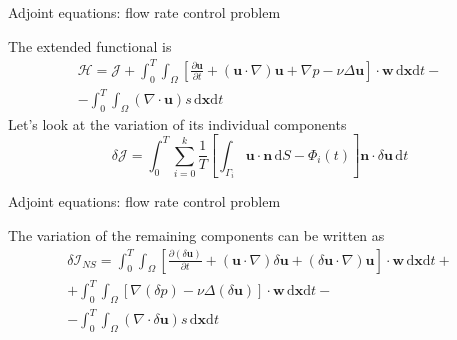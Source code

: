 \documentclass{beamer}
\begin{document}
\begin{frame}{Adjoint equations: flow rate control problem}

	The extended functional is
	\begin{multline}
		\mathcal{H}=\mathcal{J}+\int_{0}^{T}\int_{\Omega}\left[\frac{\partial\mathbf{u}}{\partial t}+\left(\mathbf{u}\cdot\nabla\right)\mathbf{u}+\nabla p-\nu\Delta\mathbf{u}\right]\cdot\mathbf{w}\,\mathrm{d}\mathbf{x}\mathrm{d}t- \\
		-\int_{0}^{T}\int_{\Omega}\left(\nabla\cdot\mathbf{u}\right)s\,\mathrm{d}\mathbf{x}\mathrm{d}t
	\end{multline}
	Let's look at the variation of its individual components
	\begin{equation}
		\delta\mathcal{J}=\int_{0}^{T}\sum_{i=0}^{k}\frac{1}{T}\left[\int_{\Gamma_{i}}\mathbf{u}\cdot\mathbf{n}\,\mathrm{d}S-\Phi_{i}\left(t\right)\right]\mathbf{n}\cdot\delta\mathbf{u}\,\mathrm{d}t
	\end{equation}

\end{frame}

\begin{frame}{Adjoint equations: flow rate control problem}

	The variation of the remaining components can be written as
	\begin{multline}
		\delta\mathcal{I}_{NS}=\int_{0}^{T}\int_{\Omega}\left[\frac{\partial\left(\delta\mathbf{u}\right)}{\partial t}+\left(\mathbf{u}\cdot\nabla\right)\delta\mathbf{u}+\left(\delta\mathbf{u}\cdot\nabla\right)\mathbf{u}\right]\cdot\mathbf{w}\,\mathrm{d}\mathbf{x}\mathrm{d}t+\\
		+\int_{0}^{T}\int_{\Omega}\left[\nabla\left(\delta p\right)-\nu\Delta\left(\delta\mathbf{u}\right)\right]\cdot\mathbf{w}\,\mathrm{d}\mathbf{x}\mathrm{d}t-\\
		-\int_{0}^{T}\int_{\Omega}\left(\nabla\cdot\delta\mathbf{u}\right)s\,\mathrm{d}\mathbf{x}\mathrm{d}t
	\end{multline}

\end{frame}
\end{document}
